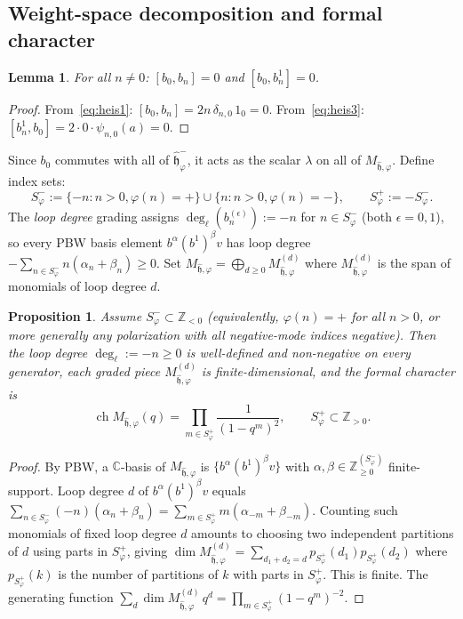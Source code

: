 \documentclass{amsart}
\DeclareMathOperator{\ch}{ch}
\newcommand{\Cx}{\mathbb{C}}
\newcommand{\Z}{\mathbb{Z}}
\newcommand{\h}{\mathfrak{h}}
\newcommand{\wh}[1]{\widehat{#1}}
\newcommand{\whh}{\wh{\h}}
\newtheorem{lemma}[theorem]{Lemma}
\newtheorem{proposition}[theorem]{Proposition}
\theoremstyle{definition}
\theoremstyle{remark}
\numberwithin{equation}{section}
\begin{document}
\subsection{Weight-space decomposition and formal character}
\label{subsec:weight}
\begin{lemma}\label{lem:b0-central}
For all $n\neq0$: $[b_0,b_n]=0$ and $[b_0,b_n^1]=0$.
\end{lemma}
\begin{proof}
From~\eqref{eq:heis1}: $[b_0,b_n]=2n\,\delta_{n,0}\,1_0=0$.
From~\eqref{eq:heis3}: $[b_n^1,b_0]=2\cdot0\cdot\psi_{n,0}(a)=0$.
\end{proof}
Since $b_0$ commutes with all of $\whh_\varphi^-$, it acts as the
scalar $\lambda$ on all of $M_{\whh,\varphi}$.
Define index sets:
\[
S_\varphi^-:=\{-n:n>0,\varphi(n)=+\}\cup\{n:n>0,\varphi(n)=-\},\qquad
S_\varphi^+:=-S_\varphi^-.
\]
The \emph{loop degree} grading assigns $\deg_\ell(b_n^{(\epsilon)}):=-n$
for $n\in S_\varphi^-$ (both $\epsilon=0,1$), so every PBW basis element
$b^\alpha(b^1)^\beta v$ has loop degree
$-\sum_{n\in S_\varphi^-}n(\alpha_n+\beta_n)\ge0$.
Set
$M_{\whh,\varphi}=\bigoplus_{d\ge0}M_{\whh,\varphi}^{(d)}$
where $M_{\whh,\varphi}^{(d)}$ is the span of monomials of loop degree $d$.
\begin{proposition}\label{prop:character}
Assume $S_\varphi^-\subset\Z_{<0}$ (equivalently, $\varphi(n)=+$ for all
$n>0$, or more generally any polarization with all negative-mode indices
negative).  Then the loop degree $\deg_\ell:=-n\ge0$ is well-defined and
non-negative on every generator, each graded piece $M_{\whh,\varphi}^{(d)}$
is finite-dimensional, and the formal character is
\begin{equation}\label{eq:char}
\ch M_{\whh,\varphi}(q)
=\prod_{m\in S_\varphi^+}\frac{1}{(1-q^m)^2},\qquad
S_\varphi^+\subset\Z_{>0}.
\end{equation}
\end{proposition}
\begin{proof}
By PBW, a $\Cx$-basis of $M_{\whh,\varphi}$ is
$\{b^\alpha(b^1)^\beta v\}$ with $\alpha,\beta\in\Z_{\ge0}^{(S_\varphi^-)}$
finite-support. Loop degree $d$ of $b^\alpha(b^1)^\beta v$ equals
$\sum_{n\in S_\varphi^-}(-n)(\alpha_n+\beta_n)=\sum_{m\in S_\varphi^+}m(\alpha_{-m}+\beta_{-m})$.
Counting such monomials of fixed loop degree $d$ amounts to choosing
two independent partitions of $d$ using parts in $S_\varphi^+$, giving
$\dim M_{\whh,\varphi}^{(d)}=\sum_{d_1+d_2=d}p_{S_\varphi^+}(d_1)p_{S_\varphi^+}(d_2)$
where $p_{S_\varphi^+}(k)$ is the number of partitions of $k$ with parts
in $S_\varphi^+$.  This is finite.  The generating function
$\sum_d\dim M_{\whh,\varphi}^{(d)}\,q^d=\prod_{m\in S_\varphi^+}(1-q^m)^{-2}$.
\end{proof}
\end{document}
